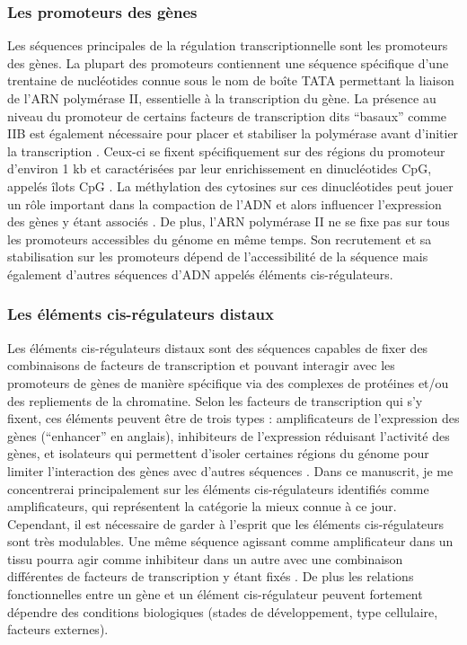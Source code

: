 \subsubsection{Les promoteurs des gènes}
\label{subsubsec:prom}

Les séquences principales de la régulation transcriptionnelle sont les promoteurs des gènes. La plupart des promoteurs contiennent une séquence spécifique d’une trentaine de nucléotides connue sous le nom de boîte TATA permettant la liaison de l’ARN polymérase II, essentielle à la transcription du gène. La présence au niveau du promoteur de certains facteurs de transcription dits “basaux” comme IIB est également nécessaire pour placer et stabiliser la polymérase avant d’initier la transcription \citep{kostrewa_rna_2009}. Ceux-ci se fixent spécifiquement sur des régions du promoteur d’environ 1 kb et caractérisées par leur enrichissement en dinucléotides \acrshort{CpG}, appelés îlots \acrshort{CpG} \citep{down_computational_2002, deaton_cpg_2011}. La méthylation des cytosines sur ces dinucléotides peut jouer un rôle important dans la compaction de l’ADN et alors influencer l’expression des gènes y étant associés \citep{moore_dna_2013}. De plus, l’ARN polymérase II ne se fixe pas sur tous les promoteurs accessibles du génome en même temps. Son recrutement et sa stabilisation sur les promoteurs dépend de l’accessibilité de la séquence mais également d’autres séquences d’ADN appelés éléments \gls{cis}-régulateurs.

\subsubsection{Les éléments \gls{cis}-régulateurs distaux}
\label{subsubsec:cis-reg}

Les éléments \gls{cis}-régulateurs distaux sont des séquences capables de fixer des combinaisons de facteurs de transcription et pouvant interagir avec les promoteurs de gènes de manière spécifique via des complexes de protéines et/ou des repliements de la chromatine. Selon les facteurs de transcription qui s’y fixent, ces éléments peuvent être de trois types : \glspl{amplificateur} de l’expression des gènes (“enhancer” en anglais), inhibiteurs de l’expression réduisant l’activité des gènes, et isolateurs qui permettent d’isoler certaines régions du génome pour limiter l’interaction des gènes avec d’autres séquences \citep{maston_transcriptional_2006}. Dans ce manuscrit, je me concentrerai principalement sur les éléments \gls{cis}-régulateurs identifiés comme \glspl{amplificateur}, qui représentent la catégorie la mieux connue à ce jour. Cependant, il est nécessaire de garder à l’esprit que les éléments \gls{cis}-régulateurs sont très modulables. Une même séquence agissant comme \gls{amplificateur} dans un tissu pourra agir comme inhibiteur dans un autre avec une combinaison différentes de facteurs de transcription y étant fixés \citep{gisselbrecht_transcriptional_2020, huang_enhancer-silencer_2022}. De plus les relations fonctionnelles entre un gène et un élément \gls{cis}-régulateur peuvent fortement dépendre des \glspl{condition} biologiques (stades de développement, type cellulaire, facteurs externes). \\


